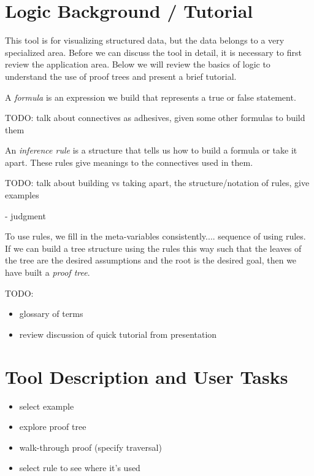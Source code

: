 \documentclass[conference]{IEEEtran}
\begin{document}
\section{Logic Background / Tutorial}

This tool is for visualizing structured data, but the data belongs to a very specialized area. Before we can discuss the tool in detail, it is necessary to first review the application area. Below we will review the basics of logic to understand the use of proof trees and present a brief tutorial.

A \textit{formula} is an expression we build that represents a true or false statement.

TODO: talk about connectives as adhesives, given some other formulas to build them

An \textit{inference rule} is a structure that tells us how to build a formula or take it apart. These rules give meanings to the connectives used in them.

TODO: talk about building vs taking apart, the structure/notation of rules, give examples

- judgment

To use rules, we fill in the meta-variables consistently.... sequence of using rules. If we can build a tree structure using the rules this way such that the leaves of the tree are the desired assumptions and the root is the desired goal, then we have built a \textit{proof tree}.

TODO:
\begin{itemize}
\item glossary of terms
\item review discussion of quick tutorial from presentation
\end{itemize}


\section{Tool Description and User Tasks}

\begin{itemize}
\item select example
\item explore proof tree
\item walk-through proof (specify traversal)
\item select rule to see where it's used
\end{itemize}
\end{document}
